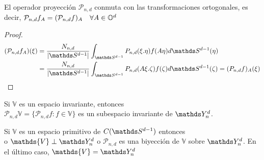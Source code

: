\begin{prop}El operador proyección $\mathcal{P}_{n,d}$ conmuta con las transformaciones ortogonales, es decir, $\mathcal{P}_{n,d}f_A=(\mathcal{P}_{n,d}f)_A \quad \forall A\in\mathbb{O}^d$
\end{prop}
\begin{proof}
	\begin{gather*}
	\begin{aligned}
	(\mathcal{P}_{n,d}f_A) (\xi) &= \frac{N_{n,d}}{|\sphere|} \int_{\sphere}P_{n,d}(\xi.\eta)f(A\eta)d\sphere(\eta) \\&= \frac{N_{n,d}}{|\sphere|} \int_{\sphere}P_{n,d}(A\xi.\zeta)f(\zeta)d\sphere(\zeta) =  
	(P_{n,d}f)_A (\xi)
	\end{aligned}
	\end{gather*}
	
\end{proof}
\begin{cor}Si $\mathds{V}$ es un espacio invariante, entonces \\$\mathcal{P}_{n,d}\mathds{V} = \{\mathcal{P}_{n,d}f : f\in\mathds{V}\}$ es un subespacio invariante de $\spharm$.
\end{cor}
\begin{thm}Si $\mathds{V}$ es un espacio primitivo de $C(\sphere)$ entonces\\ o $\mathds{V} \perp \spharm$ o $\mathcal{P}_{n,d}$ es una biyección de $\mathds{V}$ sobre $\spharm$. En el último caso, $\mathds{V}=\spharm$
\end{thm}
